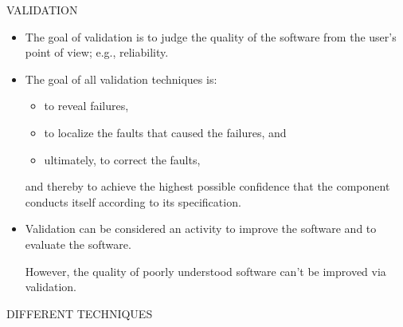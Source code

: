 \centerline{VALIDATION}

\bigskip

\begin{itemize}

\item The goal of validation is to judge the quality of the software
from the user's point of view; e.g., reliability.

\item The goal of all validation techniques is:

\begin{itemize}
\item to reveal failures,
\item to localize the faults that caused the failures, and
\item ultimately, to correct the faults,
\end{itemize}

and thereby to achieve the highest possible confidence that the
component conducts itself according to its specification.

\item Validation can be considered an activity to improve the 
software and to evaluate the software.

However, the quality of poorly understood software can't be improved
via validation.

\end{itemize}



\newpage
\centerline{DIFFERENT TECHNIQUES}
\bigskip


